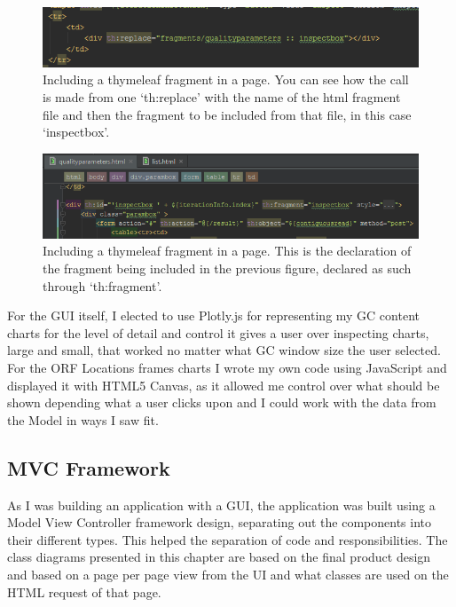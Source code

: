 \begin{figure}[H]
	\centering
\includegraphics[width=1\textwidth]{images/thymeleafinsert1}
\caption{Including a thymeleaf fragment in a page. You can see how the call is made from one `th:replace' with the name of the html fragment file and then the fragment to be included from that file, in this case `inspectbox'.}
\end{figure}
\begin{figure}[H]
\centering
\includegraphics[width=1\textwidth]{images/thymeleafinsert2}
\caption{Including a thymeleaf fragment in a page. This is the declaration of the fragment being included in the previous figure, declared as such through `th:fragment'.}
\end{figure}

For the GUI itself, I elected to use Plotly.js\cite{plotly} for representing my GC content charts for the level of detail and control it gives a user over inspecting charts, large and small, that worked no matter what GC window size the user selected. For the ORF Locations frames charts I wrote my own code using JavaScript and displayed it with HTML5 Canvas, as it allowed me control over what should be shown depending what a user clicks upon and I could work with the data from the Model in ways I saw fit.

\subsection{MVC Framework}
As I was building an application with a GUI, the application was built using a Model View Controller framework design, separating out the components into their different types. This helped the separation of code and responsibilities. The class diagrams presented in this chapter are based on the final product design and based on a page per page view from the UI and what classes are used on the HTML request of that page.

